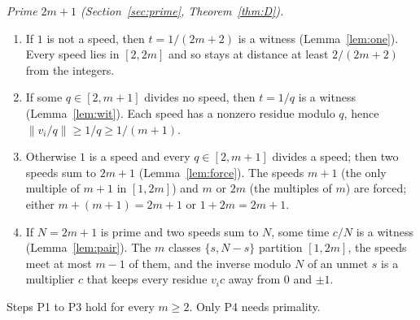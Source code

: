 \documentclass[11pt]{article}
\theoremstyle{remark}
\newcommand{\norm}[1]{\lVert #1\rVert}
\begin{document}
\smallskip\noindent\emph{Prime $2m+1$ (Section~\ref{sec:prime}, Theorem~\ref{thm:D}).}
\begin{enumerate}
\item[P1.] If $1$ is not a speed, then $t=1/(2m+2)$ is a witness (Lemma~\ref{lem:one}). Every speed lies in $[2,2m]$ and so stays at distance at least $2/(2m+2)$ from the integers.
\item[P2.] If some $q\in[2,m+1]$ divides no speed, then $t=1/q$ is a witness (Lemma~\ref{lem:wit}). Each speed has a nonzero residue modulo $q$, hence $\norm{v_i/q}\ge1/q\ge1/(m+1)$.
\item[P3.] Otherwise $1$ is a speed and every $q\in[2,m+1]$ divides a speed; then two speeds sum to $2m+1$ (Lemma~\ref{lem:force}). The speeds $m+1$ (the only multiple of $m+1$ in $[1,2m]$) and $m$ or $2m$ (the multiples of $m$) are forced; either $m+(m+1)=2m+1$ or $1+2m=2m+1$.
\item[P4.] If $N=2m+1$ is prime and two speeds sum to $N$, some time $c/N$ is a witness (Lemma~\ref{lem:pair}). The $m$ classes $\{s,N-s\}$ partition $[1,2m]$, the speeds meet at most $m-1$ of them, and the inverse modulo $N$ of an unmet $s$ is a multiplier $c$ that keeps every residue $v_ic$ away from $0$ and $\pm1$.
\end{enumerate}
Steps P1 to P3 hold for every $m\ge2$. Only P4 needs primality.
\end{document}
